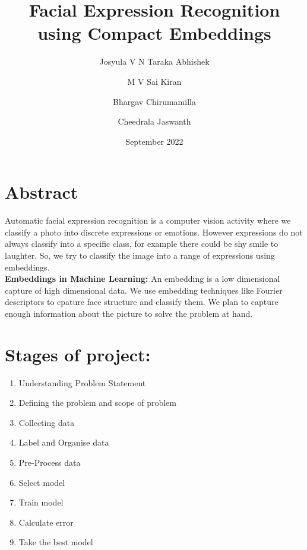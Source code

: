 \documentclass{article}
\title{Facial Expression Recognition using Compact Embeddings}
\author{Josyula V N Taraka Abhishek \\
        \and 
        M V Sai Kiran  \\
        \and 
        Bhargav Chirumamilla \\
        \and
        Cheedrala Jaswanth \\
}
\date{September 2022}
\begin{document}
\maketitle

\section{Abstract}
Automatic facial expression recognition is a computer vision activity where we classify a photo into discrete expressions or emotions. However expressions do not always classify into
a specific class, for example there could be shy smile to laughter. So, we try to classify the image into a range of expressions using embeddings.
\\

\textbf{Embeddings in Machine Learning:}
An embedding is a low dimensional capture of high dimensional data. We use embedding techniques like Fourier descriptors to cpature face structure and classify them.
We plan to capture enough information about the picture to solve the problem at hand.

\section{Stages of project:}
\begin{enumerate}
    \item Understanding Problem Statement
    \item Defining the problem and scope of problem
    \item Collecting data
    \item Label and Organise data
    \item Pre-Process data
    \item Select model
    \item Train model
    \item Calculate error
    \item Take the best model
\end{enumerate}
\end{document}
